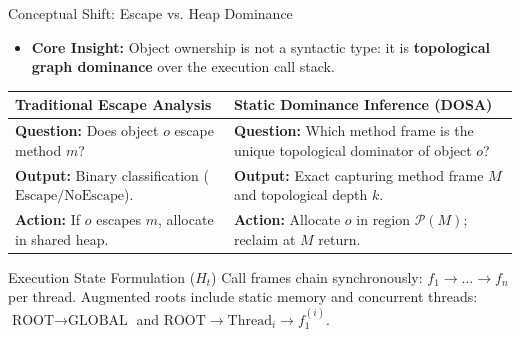 \documentclass[11pt]{beamer}
\begin{document}
\begin{frame}{Conceptual Shift: Escape vs. Heap Dominance}
  \begin{itemize}
    \item \textbf{Core Insight:} Object ownership is not a syntactic type: it is \textbf{topological graph dominance} over the execution call stack.
  \end{itemize}

  \begin{center}
    \footnotesize
    \begin{tabular}{>{\raggedright\arraybackslash}p{}>{\raggedright\arraybackslash}p{}}
      \toprule
      \textbf{Traditional Escape Analysis} & \textbf{Static Dominance Inference (DOSA)} \\
      \midrule
      \textbf{Question:} Does object $o$ escape method $m$? & \textbf{Question:} Which method frame is the unique topological dominator of object $o$? \\
      \addlinespace[2pt]
      \textbf{Output:} Binary classification ($\text{Escape} / \text{NoEscape}$). & \textbf{Output:} Exact capturing method frame $M$ and topological depth $k$. \\
      \addlinespace[2pt]
      \textbf{Action:} If $o$ escapes $m$, allocate in shared heap. & \textbf{Action:} Allocate $o$ in region $\mathcal{P}(M)$; reclaim at $M$ return. \\
      \bottomrule
    \end{tabular}
  \end{center}
  \vspace{-0.5em}

  \begin{block}{Execution State Formulation ($H_t$)}
    \footnotesize
    Call frames chain synchronously: $f_1 \to \dots \to f_n$ per thread. Augmented roots include static memory and concurrent threads: $\text{ROOT} \to \text{GLOBAL}$ and $\text{ROOT} \to \text{Thread}_i \to f_1^{(i)}$.
  \end{block}
\end{frame}
\end{document}
